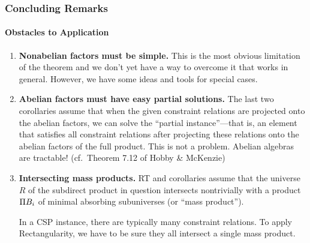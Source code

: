 \documentclass[xcolor=dvipsnames,9pt,hide notes,mathserif]{beamer}
\begin{document}
\begin{frame} \frametitle{Concluding Remarks}
  \framesubtitle{Obstacles to Application}

  \begin{enumerate}
  \item<1-> {\bf Nonabelian factors must be simple.}
    This is the most obvious limitation of the theorem and
    we don't yet have a way to overcome it that works in general.
    However, we have some ideas and tools for special cases.

  \item<2-> {\bf Abelian factors must have easy partial solutions.}
    The last two corollaries assume that
    when the given constraint relations are projected onto the abelian factors,
    we can solve the ``partial instance''---that is, an element that satisfies all
    constraint relations after projecting these relations onto the abelian
    factors of the full product. This is not a problem.  Abelian algebras are
    tractable! (cf.~Theorem 7.12 of Hobby \& McKenzie)
    

  \item<3-> {\bf Intersecting mass products.}
    RT and corollaries assume that the universe $R$ of the subdirect
    product in question intersects nontrivially
    with a product $\Pi B_i$ of minimal absorbing subuniverses
    (or ``mass product'').

    \bigskip
    In a CSP instance, there are typically many constraint relations.
    To apply Rectangularity, we have to be sure they all intersect
    a single mass product.
  \end{enumerate}

\end{frame}
\end{document}
